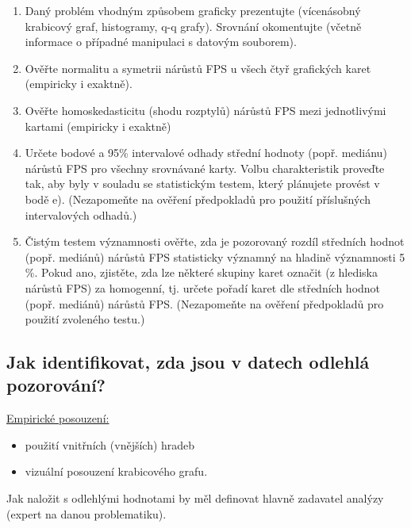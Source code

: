 \documentclass[a4paper,12pt]{article}
\begin{document}
\begin{enumerate}
    \begin{enumerate}
        \item Daný problém vhodným způsobem graficky prezentujte (vícenásobný krabicový graf, histogramy,
q-q grafy). Srovnání okomentujte (včetně informace o případné manipulaci s datovým souborem).
\newpage
\item Ověřte normalitu a symetrii nárůstů FPS u všech čtyř grafických karet (empiricky i exaktně).
\newpage
\item Ověřte homoskedasticitu (shodu rozptylů) nárůstů FPS mezi jednotlivými kartami (empiricky
i exaktně)
\newpage
\item Určete bodové a 95\% intervalové odhady střední hodnoty (popř. mediánu) nárůstů FPS pro
všechny srovnávané karty. Volbu charakteristik proveďte tak, aby byly v souladu se statistickým
testem, který plánujete provést v bodě e). (Nezapomeňte na ověření předpokladů pro použití
příslušných intervalových odhadů.)
\newpage
\item Čistým testem významnosti ověřte, zda je pozorovaný rozdíl středních hodnot (popř. mediánů)
nárůstů FPS statisticky významný na hladině významnosti 5 \%. Pokud ano, zjistěte, zda lze některé
skupiny karet označit (z hlediska nárůstů FPS) za homogenní, tj. určete pořadí karet dle středních
hodnot (popř. mediánů) nárůstů FPS. (Nezapomeňte na ověření předpokladů pro použití
zvoleného testu.)
    \end{enumerate}
\end{enumerate}
\newpage

\subsection*{\textbf{Jak identifikovat, zda jsou v datech odlehlá pozorování?}}
\ul{Empirické posouzení:}
\begin{itemize}
    \item použití vnitřních (vnějších) hradeb
    \item vizuální posouzení krabicového grafu.
\end{itemize}

Jak naložit s odlehlými hodnotami by měl definovat hlavně zadavatel analýzy (expert na danou
problematiku).
\end{document}
